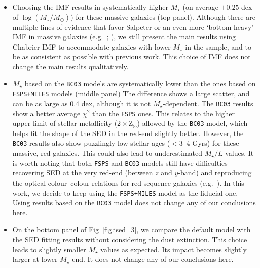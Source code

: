 \documentclass[fleqn,usenatbib]{mnras}
\def\mstar{{$M_{\star}$}}
\def\logms{{$\log (M_{\star}/M_{\odot})$}}
\def\m2l{{$M_{\star}/L$}}
\begin{document}
    \begin{itemize}

        \item Choosing the \citet{Salpeter1955} IMF results in systematically 
            higher \mstar{} (on average $+0.25$ dex of \logms{}) for these massive 
            galaxies (top panel).
            Although there are multiple lines of evidence that favor Salpeter 
            or an even more `bottom-heavy' IMF in massive galaxies 
            (e.g.\ \citealt{Conroy2012}; \citealt{Cappellari2012}), we still 
            present the main results using Chabrier IMF to accommodate galaxies 
            with lower \mstar{} in the sample, and to be as consistent as possible 
            with previous work.  
            This choice of IMF does not change the main results qualitatively. 

        \item \mstar{} based on the \texttt{BC03} models are systematically lower 
            than the ones based on \texttt{FSPS+MILES} models (middle panel)
            The difference shows a large scatter, and can be as large as 0.4 dex,
            although it is not \mstar{}-dependent. 
            The \texttt{BC03} results show a better average ${\chi}^2$ than the 
            \texttt{FSPS} ones. 
            This relates to the higher upper-limit of stellar metallicity 
            ($2 \times \mathrm{Z}_{\odot}$) allowed by the \texttt{BC03} model, 
            which helps fit the shape of the SED in the red-end slightly better.  
            However, the \texttt{BC03} results also show puzzlingly low stellar 
            ages ($< 3$--4 Gyrs) for these massive, red galaxies. 
            This could also lead to underestimated \m2l{} values.
            It is worth noting that both \texttt{FSPS} and \texttt{BC03} 
            models still have difficulties recovering SED at the very red-end 
            (between $z$ and $y$-band) and reproducing the optical colour--colour 
            relations for red-sequence galaxies (e.g.\ \citealt{MIUSCAT2}).
            In this work, we decide to keep using the \texttt{FSPS+MILES} model as 
            the fiducial one.  
            Using results based on the \texttt{BC03} model does not change any of 
            our conclusions here.
            
        \item On the bottom panel of Fig~\ref{fig:ised_3}, we compare the default 
            model with the SED fitting results without considering the dust 
            extinction. 
            This choice leads to slightly smaller \mstar{} values as expected. 
            Its impact becomes slightly larger at lower \mstar{} end. 
            It does not change any of our conclusions here.
          
    \end{itemize}
    
\end{document}
